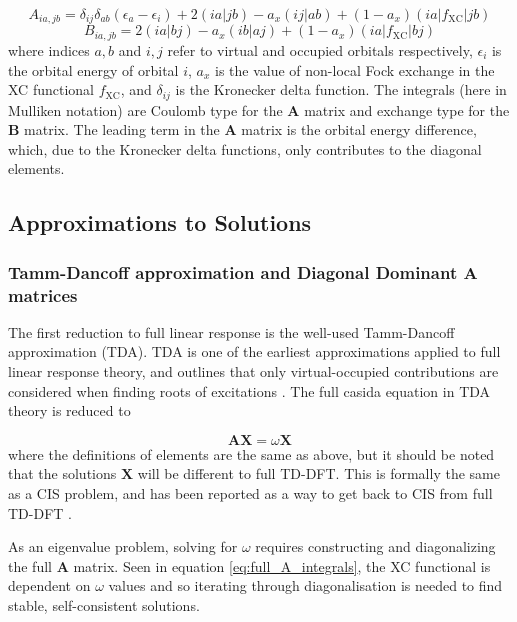 \begin{equation}
A_{ia,jb} = \delta_{ij} \delta_{ab} \left( \epsilon_a - \epsilon_i \right) + 2\left(ia|jb\right) - a_x\left(ij|ab\right) + (1- a_x)\left(ia|f_{\text{XC}}|jb\right)
\end{equation}
%
\begin{equation}
B_{ia,jb} = 2\left(ia|bj\right) - a_x\left(ib|aj\right) + (1- a_x)\left(ia|f_{\text{XC}}|bj\right)
\end{equation}
%
where indices $a,b$ and $i,j$ refer to virtual and occupied orbitals respectively,
$\epsilon_i$ is the orbital energy of orbital $i$, $a_x$ is the value of non-local
Fock exchange in the XC functional $f_{\text{XC}}$, and $\delta_{ij}$ is the Kronecker
delta function. The integrals (here in Mulliken notation) are Coulomb type for the
$\mathbf{A}$ matrix and exchange type for the $\mathbf{B}$ matrix. The leading term
in the $\mathbf{A}$ matrix is the orbital energy difference, which, due to the Kronecker 
delta functions, only contributes to the diagonal elements.

\subsection{Approximations to Solutions}
\label{subsec:chl_approxs}
\subsubsection{Tamm-Dancoff approximation and Diagonal Dominant $\mathbf{A}$ matrices}
\label{subsubsec:Tamm_Dancoff}

The first reduction to full linear response is the well-used Tamm-Dancoff approximation (TDA). 
TDA is one of the earliest approximations applied to full linear response theory, 
and outlines that only virtual-occupied contributions are considered when finding
roots of excitations \cite{Hirata1999}. The full casida equation in TDA theory is 
reduced to

\begin{equation}
\mathbf{A} \mathbf{X} = \omega \mathbf{X}
\end{equation}
%
where the definitions of elements are the same as above, but it should be noted 
that the solutions $\mathbf{X}$ will be different to full TD-DFT. This is formally
the same as a CIS problem, and has been reported as a way to get back to CIS from 
full TD-DFT \cite{Yoshimine1992, Hirata1999}.

As an eigenvalue problem, solving for $\omega$ requires constructing and diagonalizing
the full $\mathbf{A}$ matrix. Seen in equation \ref{eq:full_A_integrals}, the XC
functional is dependent on $\omega$ values and so iterating through diagonalisation
is needed to find stable, self-consistent solutions.

